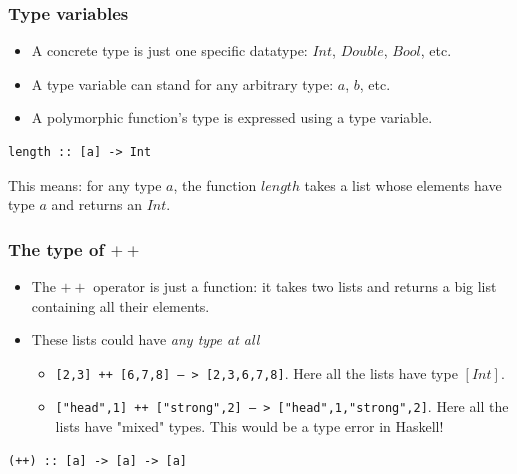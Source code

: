 \documentclass{beamer}
\begin{document}
\begin{frame}[fragile]
\frametitle{Type variables}

\begin{itemize}
\item A concrete type is just one specific datatype: $Int$,
  $Double$, $Bool$, etc.
\item A type variable can stand for any arbitrary type: $a$, $b$,
  etc.
\item A polymorphic function's type is expressed using a type
  variable.
\end{itemize}

\begin{verbatim}
length :: [a] -> Int
\end{verbatim}

This means: for any type $a$, the function $length$ takes a list
whose elements have type $a$ and returns an $Int$.

\end{frame}

\begin{frame}[fragile]
\frametitle{The type of $++$}

\begin{itemize}
\item The $++$ operator is just a function: it takes two lists and
  returns a big list containing all their elements.
\item These lists could have \emph{any type at all}
  \begin{itemize}
  \item \texttt{[2,3] ++ [6,7,8] -- > [2,3,6,7,8]}.  Here all the lists have
    type $[Int]$.
  \item \texttt{["head",1] ++ ["strong",2] -- > ["head",1,"strong",2]}.  Here all the lists
    have "mixed" types. This would be a type error in Haskell!
  \end{itemize}
\end{itemize}

\begin{verbatim}
(++) :: [a] -> [a] -> [a]
\end{verbatim}

\end{frame}
\end{document}
